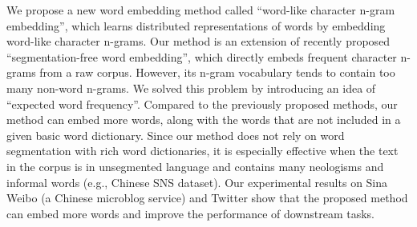 We propose a new word embedding method called ``word-like character n-gram embedding'', which learns distributed representations of words by embedding word-like character n-grams. Our method is an extension of recently proposed ``segmentation-free word embedding'', which directly embeds frequent character n-grams from a raw corpus. However, its n-gram vocabulary tends to contain too many non-word n-grams. We solved this problem by introducing an idea of ``expected word frequency''. Compared to the previously proposed methods, our method can embed more words, along with the words that are not included in a given basic word dictionary. Since our method does not rely on word segmentation with rich word dictionaries, it is especially effective when the text in the corpus is in unsegmented language and contains many neologisms and informal words (e.g., Chinese SNS dataset). Our experimental results on Sina Weibo (a Chinese microblog service) and Twitter show that the proposed method can embed more words and improve the performance of downstream tasks.
